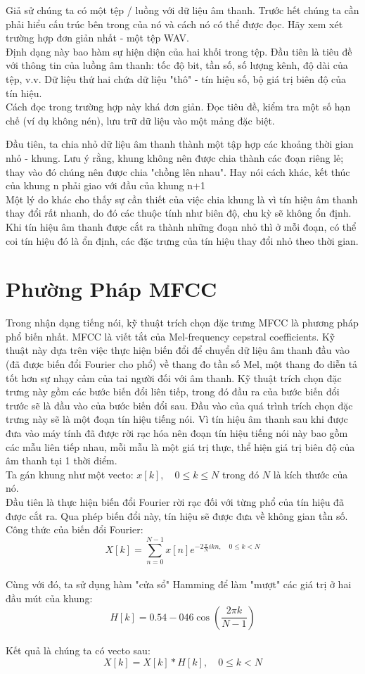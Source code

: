 \documentclass[13pt]{extreport}
\begin{document}
Giả sử chúng ta có một tệp / luồng với dữ liệu âm thanh. Trước hết chúng ta cần phải hiểu cấu trúc bên trong của nó và cách nó có thể được đọc. Hãy xem xét trường hợp đơn giản nhất - một tệp WAV.\\
Định dạng này bao hàm sự hiện diện của hai khối trong tệp. Đầu tiên là tiêu đề với thông tin của luồng âm thanh: tốc độ bit, tần số, số lượng kênh, độ dài của tệp, v.v. Dữ liệu thứ hai chứa dữ liệu "thô" - tín hiệu số, bộ giá trị biên độ của tín hiệu.\\
Cách đọc trong trường hợp này khá đơn giản. Đọc tiêu đề, kiểm tra một số hạn chế (ví dụ không nén), lưu trữ dữ liệu vào một mảng đặc biệt.

Đầu tiên, ta chia nhỏ dữ liệu âm thanh thành một tập hợp các khoảng thời gian nhỏ - khung. Lưu ý rằng, khung không nên được chia thành các đoạn riêng lẻ; thay vào đó chúng nên được chia "chồng lên nhau". Hay nói cách khác, kết thúc của khung n phải giao với đầu của khung n+1\\
Một lý do khác cho thấy sự cần thiết của việc chia khung là vì tín hiệu âm thanh thay đổi rất nhanh, do đó các thuộc tính như biên độ, chu kỳ sẽ không ổn định. Khi tín hiệu âm thanh được cắt ra thành những đoạn nhỏ thì ở mỗi đoạn, có thể coi tín hiệu đó là ổn định, các đặc trưng của tín hiệu thay đổi nhỏ theo thời gian.
\section{Phường Pháp MFCC}
Trong nhận dạng tiếng nói, kỹ thuật trích chọn đặc trưng MFCC là phương pháp phổ biến nhất. MFCC là viết tắt của Mel-frequency cepstral coefficients. Kỹ thuật này dựa trên việc thực hiện biến đổi để chuyển dữ liệu âm thanh đầu vào (đã được biến đổi Fourier cho phổ) về thang đo tần số Mel, một thang đo diễn tả tốt hơn sự nhạy cảm của tai người đối với âm thanh. Kỹ thuật trích chọn đặc trưng này gồm các bước biến đổi liên tiếp, trong đó đầu ra của bước biến đổi trước sẽ là đầu vào của bước biến đổi sau. Đầu vào của quá trình trích chọn đặc trưng này sẽ là một đoạn tín hiệu tiếng nói. Vì tín hiệu âm thanh sau khi được đưa vào máy tính đã được rời rạc hóa nên đoạn tín hiệu tiếng nói này bao gồm các mẫu liên tiếp nhau, mỗi mẫu là một giá trị thực, thể hiện giá trị biên độ của âm thanh tại 1 thời điểm.\\

Ta gán khung như một vecto: $x[k],\quad 0 \leq k \leq N$ trong đó $N$ là kích thước của nó.\\
Đầu tiên là thực hiện biến đổi Fourier rời rạc đối với từng phổ của tín hiệu đã được cắt ra. Qua phép biến đổi này, tín hiệu sẽ được đưa về không gian tần số. Công thức của biến đổi Fourier:
$$X[k]=\sum_{n=0}^{N-1}x[n]e^{-2 \frac{\pi}{N} ikn, \quad 0\leq k < N}$$
\\
Cùng với đó, ta sử dụng hàm "cửa sổ" Hamming để làm "mượt" các giá trị ở hai đầu mút của khung:
$$H[k]=0.54-046\cos\left(\frac{2\pi k}{N-1}\right)$$\\
Kết quả là chúng ta có vecto sau:
$$X[k]=X[k]*H[k], \quad 0\leq k <N$$\\
\end{document}

